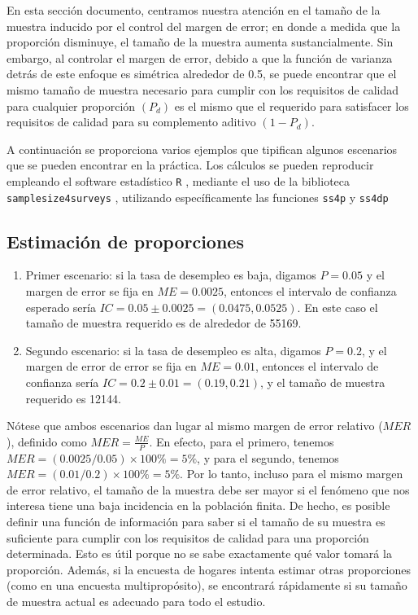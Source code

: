\documentclass[
  12pt,
]{book}
\begin{document}
En esta sección documento, centramos nuestra atención en el tamaño de la muestra inducido por el control del margen de error; en donde a medida que la proporción disminuye, el tamaño de la muestra aumenta sustancialmente. Sin embargo, al controlar el margen de error, debido a que la función de varianza detrás de este enfoque es simétrica alrededor de 0.5, se puede encontrar que el mismo tamaño de muestra necesario para cumplir con los requisitos de calidad para cualquier proporción \((P_d)\) es el mismo que el requerido para satisfacer los requisitos de calidad para su complemento aditivo \((1 - P_d)\).

A continuación se proporciona varios ejemplos que tipifican algunos escenarios que se pueden encontrar en la práctica. Los cálculos se pueden reproducir empleando el software estadístico \texttt{R} \citep{R2020}, mediante el uso de la biblioteca \texttt{samplesize4surveys} \citep{ss4s}, utilizando específicamente las funciones \texttt{ss4p} y \texttt{ss4dp}

\hypertarget{estimaciuxf3n-de-proporciones}{%
\subsection{Estimación de proporciones}\label{estimaciuxf3n-de-proporciones}}

\begin{enumerate}
\def\labelenumi{\arabic{enumi}.}
\item
  Primer escenario: si la tasa de desempleo es baja, digamos \({P}=0.05\) y el margen de error se fija en \(ME = 0.0025\), entonces el intervalo de confianza esperado sería \(IC=0.05\pm0.0025=(0.0475,0.0525)\). En este caso el tamaño de muestra requerido es de alrededor de 55169.
\item
  Segundo escenario: si la tasa de desempleo es alta, digamos \({P}=0.2\), y el margen de error de error se fija en \(ME = 0.01\), entonces el intervalo de confianza sería \(IC=0.2\pm0.01=(0.19,0.21)\), y el tamaño de muestra requerido es 12144.
\end{enumerate}

Nótese que ambos escenarios dan lugar al mismo margen de error relativo (\(MER\)), definido como \(MER=\frac{ME}{{P}}\). En efecto, para el primero, tenemos \(MER=(0.0025/0.05)\times 100\%=5\%\), y para el segundo, tenemos \(MER=(0.01/0.2)\times 100\%=5\%\). Por lo tanto, incluso para el mismo margen de error relativo, el tamaño de la muestra debe ser mayor si el fenómeno que nos interesa tiene una baja incidencia en la población finita. De hecho, es posible definir una función de información para saber si el tamaño de su muestra es suficiente para cumplir con los requisitos de calidad para una proporción determinada. Esto es útil porque no se sabe exactamente qué valor tomará la proporción. Además, si la encuesta de hogares intenta estimar otras proporciones (como en una encuesta multipropósito), se encontrará rápidamente si su tamaño de muestra actual es adecuado para todo el estudio.
\end{document}
